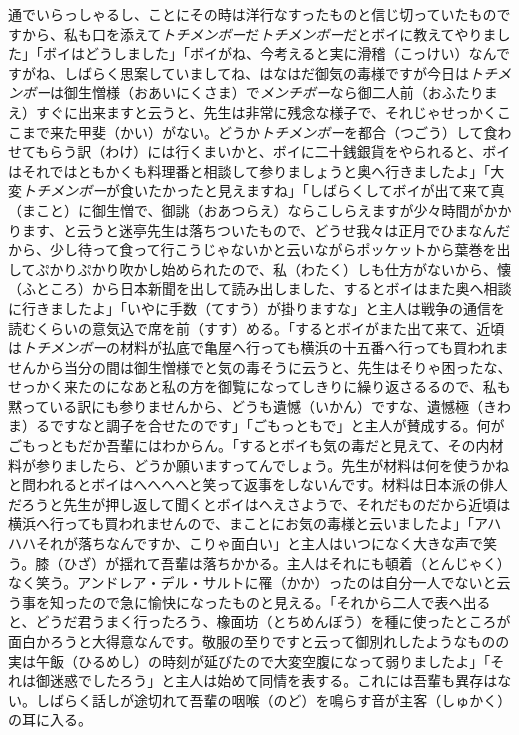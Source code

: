 \documentclass{book}
\begin{document}
通でいらっしゃるし、ことにその時は洋行なすったものと信じ切っていたものですから、私も口を添えて\emph{トチメンボー}だ\emph{トチメンボー}だとボイに教えてやりました」「ボイはどうしました」「ボイがね、今考えると実に滑稽（こっけい）なんですがね、しばらく思案していましてね、はなはだ御気の毒様ですが今日は\emph{トチメンボー}は御生憎様（おあいにくさま）で\emph{メンチボー}なら御二人前（おふたりまえ）すぐに出来ますと云うと、先生は非常に残念な様子で、それじゃせっかくここまで来た甲斐（かい）がない。どうか\emph{トチメンボー}を都合（つごう）して食わせてもらう訳（わけ）には行くまいかと、ボイに二十銭銀貨をやられると、ボイはそれではともかくも料理番と相談して参りましょうと奥へ行きましたよ」「大変\emph{トチメンボー}が食いたかったと見えますね」「しばらくしてボイが出て来て真（まこと）に御生憎で、御誂（おあつらえ）ならこしらえますが少々時間がかかります、と云うと迷亭先生は落ちついたもので、どうせ我々は正月でひまなんだから、少し待って食って行こうじゃないかと云いながらポッケットから葉巻を出してぷかりぷかり吹かし始められたので、私（わたく）しも仕方がないから、懐（ふところ）から日本新聞を出して読み出しました、するとボイはまた奥へ相談に行きましたよ」「いやに手数（てすう）が掛りますな」と主人は戦争の通信を読むくらいの意気込で席を前（すす）める。「するとボイがまた出て来て、近頃は\emph{トチメンボー}の材料が払底で亀屋へ行っても横浜の十五番へ行っても買われませんから当分の間は御生憎様でと気の毒そうに云うと、先生はそりゃ困ったな、せっかく来たのになあと私の方を御覧になってしきりに繰り返さるるので、私も黙っている訳にも参りませんから、どうも遺憾（いかん）ですな、遺憾極（きわま）るですなと調子を合せたのです」「ごもっともで」と主人が賛成する。何がごもっともだか吾輩にはわからん。「するとボイも気の毒だと見えて、その内材料が参りましたら、どうか願いますってんでしょう。先生が材料は何を使うかねと問われるとボイはへへへへと笑って返事をしないんです。材料は日本派の俳人だろうと先生が押し返して聞くとボイはへえさようで、それだものだから近頃は横浜へ行っても買われませんので、まことにお気の毒様と云いましたよ」「アハハハそれが落ちなんですか、こりゃ面白い」と主人はいつになく大きな声で笑う。膝（ひざ）が揺れて吾輩は落ちかかる。主人はそれにも頓着（とんじゃく）なく笑う。アンドレア・デル・サルトに罹（かか）ったのは自分一人でないと云う事を知ったので急に愉快になったものと見える。「それから二人で表へ出ると、どうだ君うまく行ったろう、橡面坊（とちめんぼう）を種に使ったところが面白かろうと大得意なんです。敬服の至りですと云って御別れしたようなものの実は午飯（ひるめし）の時刻が延びたので大変空腹になって弱りましたよ」「それは御迷惑でしたろう」と主人は始めて同情を表する。これには吾輩も異存はない。しばらく話しが途切れて吾輩の咽喉（のど）を鳴らす音が主客（しゅかく）の耳に入る。\\
\end{document}

